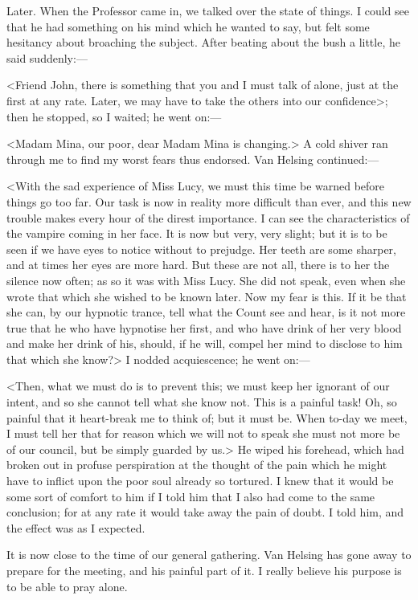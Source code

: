 \begin{diary}{Later.}
When the Professor came in, we talked over the state of things. I could see that he had something on his mind which he wanted to say, but felt some hesitancy about broaching the subject. After beating about the bush a little, he said suddenly:—

<Friend John, there is something that you and I must talk of alone, just at the first at any rate. Later, we may have to take the others into our confidence>; then he stopped, so I waited; he went on:—

<Madam Mina, our poor, dear Madam Mina is changing.> A cold shiver ran through me to find my worst fears thus endorsed. Van Helsing continued:—

<With the sad experience of Miss Lucy, we must this time be warned before things go too far. Our task is now in reality more difficult than ever, and this new trouble makes every hour of the direst importance. I can see the characteristics of the vampire coming in her face. It is now but very, very slight; but it is to be seen if we have eyes to notice without to prejudge. Her teeth are some sharper, and at times her eyes are more hard. But these are not all, there is to her the silence now often; as so it was with Miss Lucy. She did not speak, even when she wrote that which she wished to be known later. Now my fear is this. If it be that she can, by our hypnotic trance, tell what the Count see and hear, is it not more true that he who have hypnotise her first, and who have drink of her very blood and make her drink of his, should, if he will, compel her mind to disclose to him that which she know?> I nodded acquiescence; he went on:—

<Then, what we must do is to prevent this; we must keep her ignorant of our intent, and so she cannot tell what she know not. This is a painful task! Oh, so painful that it heart-break me to think of; but it must be. When to-day we meet, I must tell her that for reason which we will not to speak she must not more be of our council, but be simply guarded by us.> He wiped his forehead, which had broken out in profuse perspiration at the thought of the pain which he might have to inflict upon the poor soul already so tortured. I knew that it would be some sort of comfort to him if I told him that I also had come to the same conclusion; for at any rate it would take away the pain of doubt. I told him, and the effect was as I expected.

It is now close to the time of our general gathering. Van Helsing has gone away to prepare for the meeting, and his painful part of it. I really believe his purpose is to be able to pray alone.
\end{diary}
 

